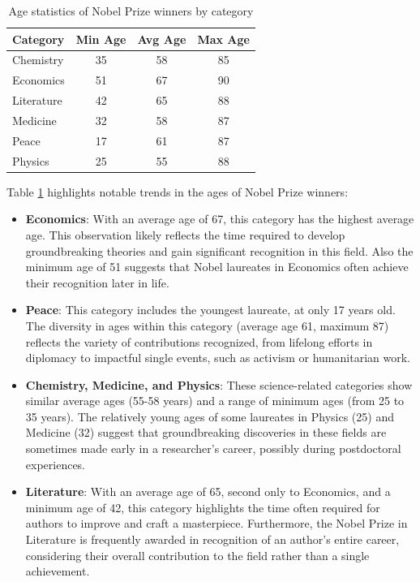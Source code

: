 \documentclass{article}
\begin{document}
\begin{table}[H]
	\centering
	\caption{Age statistics of Nobel Prize winners by category}
	\begin{tabular}{|l|c|c|c|}
		\hline
		\textbf{Category} & \textbf{Min Age} & \textbf{Avg Age} & \textbf{Max Age} \\ \hline
		Chemistry         & 35               & 58               & 85               \\ \hline
		Economics         & 51               & 67               & 90               \\ \hline
		Literature        & 42               & 65               & 88               \\ \hline
		Medicine          & 32               & 58               & 87               \\ \hline
		Peace             & 17               & 61               & 87               \\ \hline
		Physics           & 25               & 55               & 88               \\ \hline
	\end{tabular}
	\label{tab:age_analysis}
\end{table}

Table \ref{tab:age_analysis} highlights notable trends in the ages of Nobel Prize winners:

\begin{itemize}
	\item \textbf{Economics}: With an average age of 67, this category has the highest average age.
	      This observation likely reflects the time required to develop groundbreaking theories and gain significant recognition in this field. Also the minimum age of 51 suggests that Nobel laureates in Economics often
	      achieve their recognition later in life.

	\item \textbf{Peace}: This category includes the youngest laureate, at only 17 years old.
	      The diversity in ages within this category (average age 61, maximum 87) reflects the variety of
	      contributions recognized, from lifelong efforts in diplomacy to impactful single events, such as activism
	      or humanitarian work.

	\item \textbf{Chemistry, Medicine, and Physics}: These science-related categories show similar average ages
	      (55-58 years) and a range of minimum ages (from 25 to 35 years). The relatively young ages of some laureates
	      in Physics (25) and Medicine (32) suggest that groundbreaking discoveries in these fields are sometimes made
	      early in a researcher's career, possibly during postdoctoral experiences.

	\item \textbf{Literature}: With an average age of 65, second only to Economics, and a minimum age of 42, this
	      category highlights the time often required for authors to improve and craft a masterpiece.
	      Furthermore, the Nobel Prize in Literature is frequently awarded in recognition of an author's
	      entire career, considering their overall contribution to the field rather than a single achievement.
\end{itemize}
\end{document}
